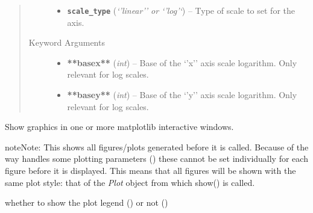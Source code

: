 \documentclass[a4paper,10pt,english]{sphinxmanual}
\begin{document}
\begin{fulllineitems}
\begin{fulllineitems}
\begin{quote}
\begin{description}
\begin{itemize}
\item {} 
\textbf{\texttt{scale\_type}} (\emph{`'linear'' or `'log'`}) -- Type of scale to set for the axis.

\end{itemize}

\item[{Keyword Arguments}] \leavevmode\begin{itemize}
\item {} 
\textbf{**basex**} (\emph{int}) --
Base of the `'x'' axis scale logarithm. Only relevant for log
scales.

\item {} 
\textbf{**basey**} (\emph{int}) --
Base of the `'y'' axis scale logarithm. Only relevant for log
scales.

\end{itemize}

\end{description}\end{quote}

\end{fulllineitems}


\begin{fulllineitems}
\label{module_doc:kafe.plot.Plot.show}
Show graphics in one or more matplotlib interactive windows.

\begin{notice}{note}{Note:}
This shows all figures/plots generated before it is called. Because
of the way  handles some plotting parameters
() these cannot be set individually for each
figure before it is displayed. This means that all figures will be
shown with the same plot style: that of the \emph{Plot} object from
which show() is called.
\end{notice}

\end{fulllineitems}


\begin{fulllineitems}
\label{module_doc:kafe.plot.Plot.show_legend}
whether to show the plot legend () or not ()

\end{fulllineitems}


\end{fulllineitems}
\end{document}
